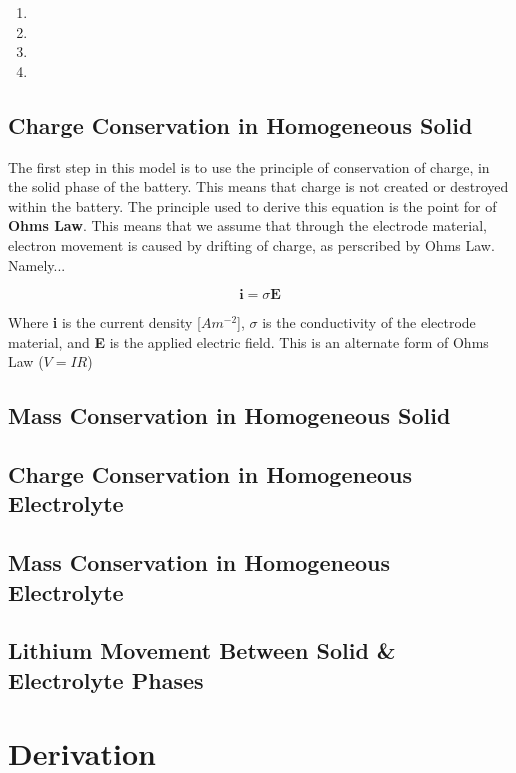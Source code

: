 \documentclass[lettersize,journal]{IEEEtran}
\begin{document}
\begin{enumerate}
  \item
  \item
  \item
  \item

\end{enumerate}






\subsection{Charge Conservation in Homogeneous Solid}

The first step in this model is to use the principle of conservation of charge, in the solid phase of the battery. This means that charge is not created or destroyed within the battery. The principle used to derive this equation is the point for of \textbf{Ohms Law}. This means that we assume that through the electrode material, electron movement is caused by drifting of charge, as perscribed by Ohms Law. Namely...

\[
\textbf{i} = \sigma\textbf{E}
\]

Where \textbf{i} is the current density [$Am^{-2}$], $\sigma$ is the conductivity of the electrode material, and \textbf{E} is the applied electric field. This is an alternate form of Ohms Law ($V = IR$)


\subsection{Mass Conservation in Homogeneous Solid}
\subsection{Charge Conservation in Homogeneous Electrolyte}
\subsection{Mass Conservation in Homogeneous Electrolyte}
\subsection{Lithium Movement Between Solid \& Electrolyte Phases}




\section{Derivation}
\end{document}
